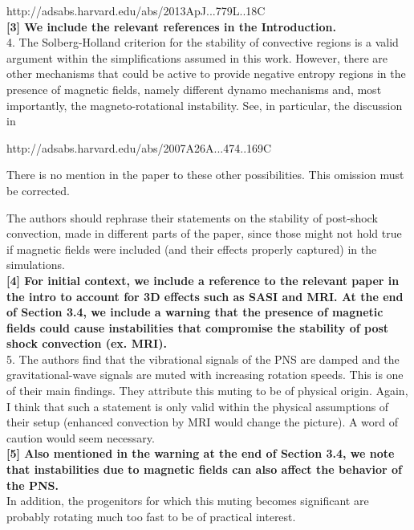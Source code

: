 \documentclass[11pt]{article}
\begin{document}
http://adsabs.harvard.edu/abs/2013ApJ...779L..18C\\

\textbf{[3] We include the relevant references in the Introduction.}\\


4. The Solberg-Holland criterion for the stability of convective regions is
a valid argument within the simplifications assumed in this work. However, 
there are other mechanisms that could be active to provide negative entropy 
regions in the presence of magnetic fields, namely different dynamo mechanisms 
and, most importantly, the magneto-rotational instability. See, in particular, 
the discussion in  

http://adsabs.harvard.edu/abs/2007A26A...474..169C

There is no mention in the paper to these other possibilities. This omission 
must be corrected.

The authors should rephrase their statements on the stability of post-shock 
convection, made in different parts of the paper, since those might not hold 
true if magnetic fields were included (and their effects properly captured) 
in the simulations.\\

\textbf{[4] For initial context, we include a reference to the relevant paper in the intro to account for 3D effects such as SASI and MRI.   At the end of Section 3.4, we include a warning that the presence of magnetic fields could cause instabilities that compromise the stability of post shock convection (ex. MRI).  }\\

5. The authors find that the vibrational signals of the PNS are damped and 
the gravitational-wave signals are muted with increasing rotation speeds. This
is one of their main findings. They attribute this muting to be of physical origin.
Again, I think that such a statement is only valid within the physical assumptions 
of their setup (enhanced convection by MRI would change the picture). A word of  caution would seem necessary. \\

\textbf{[5] Also mentioned in the warning at the end of Section 3.4, we note that instabilities due to magnetic fields can also affect the behavior of the PNS.}\\

In addition, the progenitors for which this muting becomes significant are probably rotating much too fast to be of practical 
interest. \\
\end{document}
